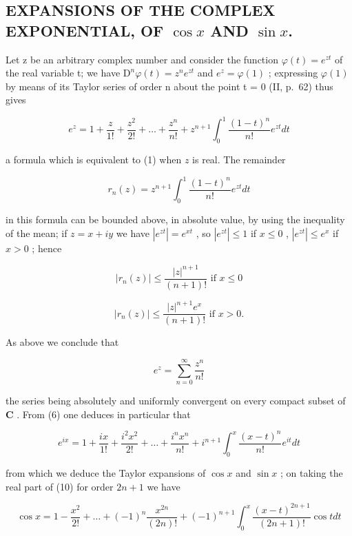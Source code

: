 \subsection{\texorpdfstring{EXPANSIONS OF THE COMPLEX EXPONENTIAL, OF \(\cos x\) AND \(\sin x\).}{EXPANSIONS OF THE COMPLEX EXPONENTIAL, OF COS X AND SIN X}}

Let z be an arbitrary complex number and consider the function \(\varphi(t) = e^{zt}\) of the real variable t; we have \(\mathrm{D}^{n}\varphi(t) = z^{n}e^{zt}\) and \(e^{z} = \varphi(1)\) ; expressing \(\varphi(1)\) by means of its Taylor series of order n about the point t = 0 (II, p.~62) thus gives

\[
e ^ {z} = 1 + \frac {z}{1 !} + \frac {z ^ {2}}{2 !} + \dots + \frac {z ^ {n}}{n !} + z ^ {n + 1} \int_ {0} ^ {1} \frac {(1 - t) ^ {n}}{n !} e ^ {z t} d t\tag{6}
\]

a formula which is equivalent to (1) when \(z\) is real. The remainder

\[
r _ {n} (z) = z ^ {n + 1} \int_ {0} ^ {1} \frac {(1 - t) ^ {n}}{n !} e ^ {z t} d t
\]

in this formula can be bounded above, in absolute value, by using the inequality of the mean; if \(z = x + iy\) we have \(|e^{zt}| = e^{xt}\) , so \(|e^{zt}| \leqslant 1\) if \(x \leqslant 0\) , \(|e^{zt}| \leqslant e^x\) if \(x > 0\) ; hence

\[
\left| r _ {n} (z) \right| \leqslant \frac {\left| z \right| ^ {n + 1}}{(n + 1) !} \text {   if   } x \leqslant 0\tag{7}
\]

\[
| r _ {n} (z) | \leqslant \frac {| z | ^ {n + 1} e ^ {x}}{(n + 1) !} \text {   if   } x > 0.\tag{8}
\]

As above we conclude that

\[
e ^ {z} = \sum_ {n = 0} ^ {\infty} \frac {z ^ {n}}{n !}\tag{9}
\]

the series being absolutely and uniformly convergent on every compact subset of \(\mathbf{C}\) . From (6) one deduces in particular that

\[
e ^ {i x} = 1 + \frac {i x}{1 !} + \frac {i ^ {2} x ^ {2}}{2 !} + \dots + \frac {i ^ {n} x ^ {n}}{n !} + i ^ {n + 1} \int_ {0} ^ {x} \frac {(x - t) ^ {n}}{n !} e ^ {i t} d t\tag{10}
\]

from which we deduce the Taylor expansions of \(\cos x\) and \(\sin x\) ; on taking the real part of (10) for order \(2n + 1\) we have

\[
\cos x = 1 - \frac {x ^ {2}}{2 !} + \dots + (- 1) ^ {n} \frac {x ^ {2 n}}{(2 n) !} + (- 1) ^ {n + 1} \int_ {0} ^ {x} \frac {(x - t) ^ {2 n + 1}}{(2 n + 1) !} \cos t d t\tag{11}
\]

